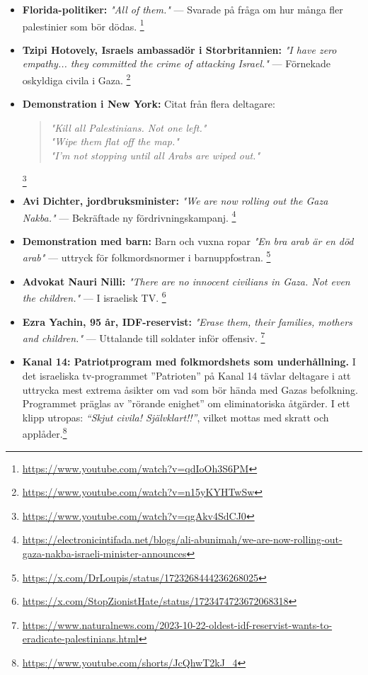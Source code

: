 \begin{itemize}
    \item \textbf{Florida-politiker:} \textit{"All of them."} — Svarade på fråga om hur många fler palestinier som bör dödas. \footnote{\url{https://www.youtube.com/watch?v=qdIoOh3S6PM}}

    \item \textbf{Tzipi Hotovely, Israels ambassadör i Storbritannien:} \textit{"I have zero empathy... they committed the crime of attacking Israel."} — Förnekade oskyldiga civila i Gaza. \footnote{\url{https://www.youtube.com/watch?v=n15yKYHTwSw}}

    \item \textbf{Demonstration i New York:} Citat från flera deltagare:
    \begin{quote}
    \textit{"Kill all Palestinians. Not one left."}\\
    \textit{"Wipe them flat off the map."}\\
    \textit{"I’m not stopping until all Arabs are wiped out."}
    \end{quote}
    \footnote{\url{https://www.youtube.com/watch?v=qgAkv4SdCJ0}}

    \item \textbf{Avi Dichter, jordbruksminister:} \textit{"We are now rolling out the Gaza Nakba."} — Bekräftade ny fördrivningskampanj. \footnote{\url{https://electronicintifada.net/blogs/ali-abunimah/we-are-now-rolling-out-gaza-nakba-israeli-minister-announces}}

    \item \textbf{Demonstration med barn:} Barn och vuxna ropar \textit{"En bra arab är en död arab"} — uttryck för folkmordsnormer i barnuppfostran. \footnote{\url{https://x.com/DrLoupis/status/1723268444236268025}}

    \item \textbf{Advokat Nauri Nilli:} \textit{"There are no innocent civilians in Gaza. Not even the children."} — I israelisk TV. \footnote{\url{https://x.com/StopZionistHate/status/1723474723672068318}}

    \item \textbf{Ezra Yachin, 95 år, IDF-reservist:} \textit{"Erase them, their families, mothers and children."} — Uttalande till soldater inför offensiv. \footnote{\url{https://www.naturalnews.com/2023-10-22-oldest-idf-reservist-wants-to-eradicate-palestinians.html}}

\item \textbf{Kanal 14: Patriotprogram med folkmordshets som underhållning.} I det israeliska tv-programmet ”Patrioten” på Kanal 14 tävlar deltagare i att uttrycka mest extrema åsikter om vad som bör hända med Gazas befolkning. Programmet präglas av ”rörande enighet” om eliminatoriska åtgärder. I ett klipp utropas: \textit{“Skjut civila! Självklart!!”}, vilket mottas med skratt och applåder.\footnote{\url{https://www.youtube.com/shorts/JcQhwT2kJ_4}}


\end{itemize}
